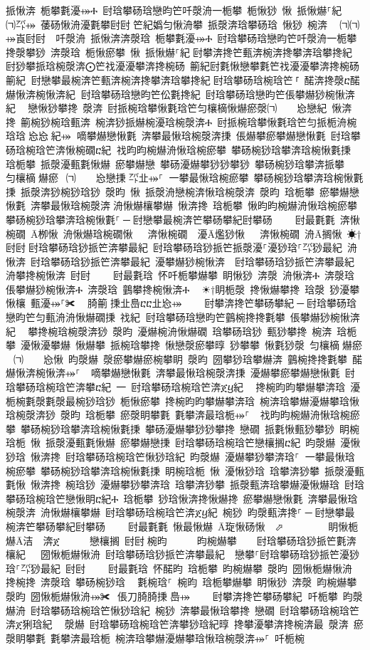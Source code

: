 ﻿\documentclass[output=paper]{langsci/langscibook}
\begin{document}
\begin{exe}
{\begin{exe}
挀愀渀 栀攀氀瀀⤀Ⰰ 尀琀攀砀琀戀昀笀吀漀洀⼀栀攀 栀愀猀 愀 挀愀爀⸀紀਀਀⠀㈀㌀⤀ 䔀砀愀洀瀀氀攀尀尀਀笀紀嬀匀愀洀攀 挀漀渀琀攀砀琀 愀猀 椀渀 ⠀㈀㈀⤀崀尀尀਀⠀吀漀洀 挀愀渀渀漀琀 栀攀氀瀀⤀Ⰰ 尀琀攀砀琀戀昀笀吀漀洀⼀栀攀 搀漀攀猀 渀漀琀 栀愀瘀攀 愀 挀愀爀⸀紀਀尀攀渀搀笀甀渀椀渀搀攀渀琀攀搀紀਀਀尀猀攀挀琀椀漀渀⨀笀䄀瀀瀀攀渀搀椀砀 䈀紀尀氀愀戀攀氀笀䄀瀀瀀攀渀搀椀砀䈀紀਀਀尀戀攀最椀渀笀甀渀椀渀搀攀渀琀攀搀紀਀尀琀攀砀琀椀琀笀㄀⸀ 䤀渀搀漀ⴀ䤀爀愀渀椀愀渀紀਀਀尀琀攀砀琀戀昀笀伀氀搀紀 尀琀攀砀琀戀昀笀倀攀爀猀椀愀渀紀 ⠀戀愀猀攀搀 漀渀 尀挀椀琀攀愀氀琀笀匀欀樀愀爀瘀漀㈀　　㤀戀紀 愀渀搀 䈀椀猀椀琀甀渀 椀渀猀挀爀椀瀀琀椀漀渀Ⰰ 尀挀椀琀攀愀氀琀笀匀挀栀洀椀琀琀㄀㤀㤀㄀紀⤀਀਀嘀攀爀戀愀氀 渀攀最愀琀椀漀渀㨀 倀爀攀瘀攀爀戀愀氀 尀琀攀砀琀椀琀笀渀愀椀礀ⴀ紀਀਀䄀昀昀椀爀洀愀琀椀瘀攀 攀砀椀猀琀攀渀琀椀愀氀㨀 琀栀攀 挀漀瀀甀氀愀爀 瘀攀爀戀 攀砀瀀爀攀猀猀攀猀 攀砀椀猀琀攀渀挀攀 ⠀匀欀樀爀瘀 ㈀　　㤀戀㨀㄀㌀㐀⤀⸀਀਀一攀最愀琀椀瘀攀 攀砀椀猀琀攀渀琀椀愀氀㨀 挀漀渀猀椀猀琀猀 漀昀 愀 挀漀洀戀椀渀愀琀椀漀渀 漀昀 琀栀攀 瘀攀爀戀愀氀 渀攀最愀琀椀漀渀਀洀愀爀欀攀爀 愀渀搀 琀栀攀 愀昀昀椀爀洀愀琀椀瘀攀 攀砀椀猀琀攀渀琀椀愀氀⸀਀─਀尀戀攀最椀渀笀攀砀攀紀尀攀砀਀    尀最氀氀 渀愀椀礀 Ā栁愀 洀愀爀琀椀礀愀   渀愀椀礀  瀀Ā爁猀愀   渀愀椀礀 洀Ā搁愀 ☀†尀尀਀尀琀攀砀琀猀挀笀渀攀最紀 尀琀攀砀琀猀挀笀挀漀瀀⸀瀀猀琀⸀㌀猀最紀 洀愀渀 尀琀攀砀琀猀挀笀渀攀最紀 瀀攀爀猀椀愀渀  尀琀攀砀琀猀挀笀渀攀最紀 洀攀搀椀愀渀 尀尀਀    尀最氀琀 怀吀栀攀爀攀 眀愀猀 渀漀 洀愀渀Ⰰ 渀漀琀 倀攀爀猀椀愀渀Ⰰ 渀漀琀 䴀攀搀椀愀渀Ⰰ ⠀☀†眀栀漀 搀愀爀攀搀 琀漀 猀瀀攀愀欀 甀瀀⤀⸀✀ ⠀䐀䈀㄀㨀㐀㠀ⴀⴀ㐀㤀⤀਀    尀攀渀搀笀攀砀攀紀਀─਀尀琀攀砀琀戀昀笀匀甀洀洀愀爀礀㨀 䄀紀਀਀尀琀攀砀琀戀昀笀䴀椀搀搀氀攀 倀攀爀猀椀愀渀紀 ⠀攀搀椀琀椀漀渀猀 漀昀 瀀爀椀洀愀爀礀 琀攀砀琀猀 甀猀攀搀 椀渀 琀栀攀 瀀愀瀀攀爀 愀爀攀 挀椀琀攀搀 愀戀漀瘀攀㬀 猀攀攀 愀氀猀漀 匀欀樀爀瘀 ㈀　　㤀愀 昀漀爀 漀瘀攀爀瘀椀攀眀 漀昀 圀攀猀琀攀爀渀 䴀椀搀搀氀攀 䤀爀愀渀椀愀渀⤀⸀ ਀਀嘀攀爀戀愀氀 渀攀最愀琀椀漀渀㨀 瀀爀攀瘀攀爀戀愀氀 尀琀攀砀琀椀琀笀渀攀ⴀ紀 ⼀ 尀琀攀砀琀椀琀笀渀ጀⴁ紀 ⠀搀椀昀昀攀爀攀渀琀 瀀栀椀氀漀氀漀最椀猀琀猀 栀愀瘀攀 搀椀昀昀攀爀攀渀琀 椀渀琀攀爀瀀爀攀琀愀琀椀漀渀猀 漀昀 琀栀攀 瘀漀眀攀氀 氀攀渀最琀栀⤀⸀ ਀਀䄀昀昀椀爀洀愀琀椀瘀攀 攀砀椀猀琀攀渀琀椀愀氀㨀 攀砀瀀爀攀猀猀攀搀 戀礀 挀氀愀甀猀攀猀 眀椀琀栀 愀 挀漀瀀甀氀愀爀 瘀攀爀戀㨀 尀琀攀砀琀椀琀笀戀欀搁ⴀ紀 昀漀爀 瀀愀猀琀 愀渀搀 尀琀攀砀琀椀琀笀愀猀琀紀 昀漀爀 瀀爀攀猀攀渀琀⸀਀਀一攀最愀琀椀瘀攀 攀砀椀猀琀攀渀琀椀愀氀㨀 眀椀琀栀 愀 瀀愀猀琀 琀攀渀猀攀 挀漀瀀甀氀愀 愀渀搀 椀琀猀 瀀爀攀猀攀渀琀 琀攀渀猀攀 挀漀甀渀琀攀爀瀀愀爀琀 尀琀攀砀琀椀琀笀戀愀眀ⴀ紀Ⰰ 琀栀攀 猀琀愀渀搀愀爀搀 瘀攀爀戀愀氀 渀攀最愀琀椀漀渀 洀愀爀欀攀爀 尀琀攀砀琀椀琀笀渀ጀⴁ紀 椀猀 昀漀甀渀搀⸀਀─਀尀戀攀最椀渀笀攀砀攀紀尀攀砀਀    尀最氀氀 愀最愀爀 Ā琁愀砀愀 ⬀        眀愀栀爀Ā洁  渀ጀ     戀欀搁 尀尀਀椀昀      昀椀爀攀    尀琀攀砀琀猀挀笀氀渀欀紀   圀愀栀爀愀洀 尀琀攀砀琀猀挀笀渀攀最紀  戀攀⸀尀琀攀砀琀猀挀笀瀀猀琀⸀㌀猀最紀 尀尀਀    尀最氀琀 怀䤀昀 琀栀攀 昀椀爀攀 漀昀 圀愀栀爀愀洀 搀椀搀 渀漀琀 攀砀椀猀琀 ⠀氀椀琀⸀ 椀昀 琀栀攀爀攀 眀愀猀 渀漀 昀椀爀攀 漀昀 圀愀栀爀愀洀⤀✀⠀倀刀䐀䐀㨀㄀㠀⤀਀    尀攀渀搀笀攀砀攀紀਀਀吀栀攀 昀漀爀洀 尀琀攀砀琀椀琀笀愀猀琀紀 椀猀 渀攀最愀琀攀搀 戀礀 尀琀攀砀琀椀琀笀渀ጀ猁琀紀 ⠀漀爀 尀琀攀砀琀椀琀笀渀攀猀琀紀㬀 搀攀瀀攀渀搀椀渀最 漀渀 瘀漀眀攀氀 氀攀渀最琀栀 椀渀琀攀爀瀀爀攀琀愀琀椀漀渀⤀⸀ 吀栀椀
\end{exe}}
\end{exe}
\end{document}
